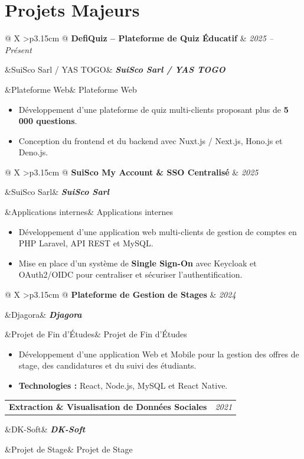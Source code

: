 \documentclass[10pt,a4paper]{article}
\makeatletter
\newcommand{\cventry}[4]{%
    \needspace{4\baselineskip}%
    \noindent
    \begin{tabularx}{\linewidth}{
        @{}
        X
        >{\raggedleft\arraybackslash}p{3.15cm}
        @{}
    }
        \textbf{\large #1}
        &
        {\small\color{secondary}\textit{#2}}
    \end{tabularx}
    \par
    \ifx&#3&
    \else
        \noindent
        \textbf{\textit{#3}}
        \par
    \fi
    \ifx&#4&
    \else
        \noindent
        {\small #4}
        \par
    \fi
    \vspace{2.5pt}%
}
\makeatother
\begin{document}

\section{Projets Majeurs}

\cventry
{DefiQuiz -- Plateforme de Quiz Éducatif}
{2025 -- Présent}
{SuiSco Sarl / YAS TOGO}
{Plateforme Web}

\begin{itemize}

    \item Développement d'une plateforme de quiz multi-clients
    proposant plus de \textbf{5\,000 questions}.

    \item Conception du frontend et du backend avec
    Nuxt.js / Next.js, Hono.js et Deno.js.

\end{itemize}

\cventry
{SuiSco My Account \& SSO Centralisé}
{2025}
{SuiSco Sarl}
{Applications internes}

\begin{itemize}

    \item Développement d'une application web multi-clients de gestion
    de comptes en PHP Laravel, API REST et MySQL.

    \item Mise en place d'un système de \textbf{Single Sign-On}
    avec Keycloak et OAuth2/OIDC pour centraliser et sécuriser
    l'authentification.

\end{itemize}

\cventry
{Plateforme de Gestion de Stages}
{2024}
{Djagora}
{Projet de Fin d'Études}

\begin{itemize}

    \item Développement d'une application Web et Mobile pour la gestion
    des offres de stage, des candidatures et du suivi des étudiants.

    \item \textbf{Technologies :} React, Node.js, MySQL et React Native.

\end{itemize}

\cventry
{Extraction \& Visualisation de Données Sociales}
{2021}
{DK-Soft}
{Projet de Stage}
\end{document}
